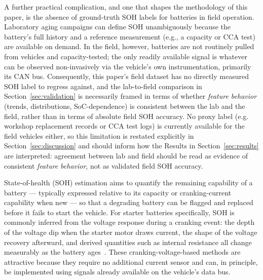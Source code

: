 \documentclass[conference]{IEEEtran}
\begin{document}
A further practical complication, and one that shapes the methodology of this paper, is the absence of ground-truth SOH labels for batteries in field operation. Laboratory aging campaigns can define SOH unambiguously because the battery's full history and a reference measurement (e.g., a capacity or CCA test) are available on demand. In the field, however, batteries are not routinely pulled from vehicles and capacity-tested; the only readily available signal is whatever can be observed non-invasively via the vehicle's own instrumentation, primarily its CAN bus. Consequently, this paper's field dataset has no directly measured SOH label to regress against, and the lab-to-field comparison in Section~\ref{sec:validation} is necessarily framed in terms of whether \emph{feature behavior} (trends, distributions, SoC-dependence) is consistent between the lab and the field, rather than in terms of absolute field SOH accuracy. No proxy label (e.g. workshop replacement records or CCA test logs) is currently available for the field vehicles either, so this limitation is restated explicitly in Section~\ref{sec:discussion} and should inform how the Results in Section~\ref{sec:results} are interpreted: agreement between lab and field should be read as evidence of consistent \emph{feature behavior}, not as validated field SOH accuracy.

State-of-health (SOH) estimation aims to quantify the remaining capability of a battery --- typically expressed relative to its capacity or cranking-current capability when new --- so that a degrading battery can be flagged and replaced before it fails to start the vehicle. For starter batteries specifically, SOH is commonly inferred from the voltage response during a cranking event: the depth of the voltage dip when the starter motor draws current, the shape of the voltage recovery afterward, and derived quantities such as internal resistance all change measurably as the battery ages~\cite{kerleyAutomotiveLeadacidBattery2015,stepresponse_soh}. These cranking-voltage-based methods are attractive because they require no additional current sensor and can, in principle, be implemented using signals already available on the vehicle's data bus.
\end{document}
